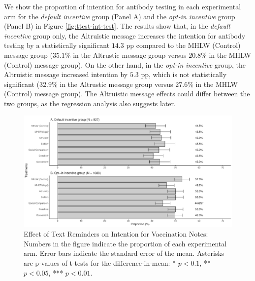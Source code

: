 \documentclass[
]{article}
\begin{document}
We show the proportion of intention for antibody testing in each experimental arm for the \emph{default incentive} group (Panel A) and the \emph{opt-in incentive} group (Panel B) in Figure \ref{fig:ttest-int-test}. The results show that, in the \emph{default incentive} group only, the Altruistic message increases the intention for antibody testing by a statistically significant \(14.3\) pp compared to the MHLW (Control) message group (\(35.1\)\% in the Altrustic message group versus \(20.8\)\% in the MHLW (Control) message group). On the other hand, in the \emph{opt-in incentive} group, the Altruistic message increased intention by \(5.3\) pp, which is not statistically significant (\(32.9\)\% in the Altrustic message group versus \(27.6\)\% in the MHLW (Control) message group). The Altruistic message effects could differ between the two groups, as the regression analysis also suggests later.

\begin{figure}[t]
\includegraphics{discussion-paper_files/figure-latex/ttest-int-vacc-1} \caption{Effect of Text Reminders on Intention for Vaccination Notes: Numbers in the figure indicate the proportion of each experimental arm. Error bars indicate the standard error of the mean. Asterisks are p-values of t-tests for the difference-in-mean: * $p < 0.1$, ** $p < 0.05$, *** $p < 0.01$.}\label{fig:ttest-int-vacc}
\end{figure}
\end{document}
